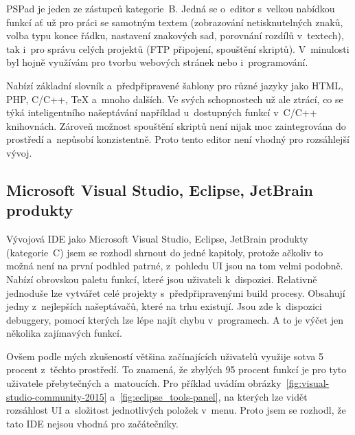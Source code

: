 PSPad je jeden ze zástupců kategorie~B. 
Jedná se o~editor s~velkou nabídkou funkcí ať už pro práci se samotným textem (zobrazování netisknutelných znaků, volba typu konce řádku, nastavení znakových sad, porovnání rozdílů v~textech), tak i~pro správu celých projektů (FTP připojení, spouštění skriptů).
V~minulosti byl hojně využívám pro tvorbu webových stránek nebo i~programování.

Nabízí základní slovník a~předpřipravené šablony pro různé jazyky jako HTML, PHP, C/C++, TeX a~mnoho dalších.
Ve svých schopnostech už ale ztrácí, co se týká inteligentního našeptávání například u~dostupných funkcí v~C/C++ knihovnách.
% 
% 
Zároveň možnost spouštění skriptů není nijak moc zaintegrována do prostředí a~nepůsobí konzistentně.
Proto tento editor není vhodný pro rozsáhlejší vývoj.

\subsection{Microsoft Visual Studio, Eclipse, JetBrain produkty}


Vývojová IDE jako Microsoft Visual Studio, Eclipse, JetBrain produkty (kategorie~C) jsem se rozhodl shrnout do jedné kapitoly, protože ačkoliv to možná není na první podhled patrné, z~pohledu UI jsou na tom velmi podobně.
Nabízí obrovskou paletu funkcí, které jsou uživateli k~dispozici. 
Relativně jednoduše lze vytvářet celé projekty s~předpřipravenými build procesy. 
Obsahují jedny z~nejlepších našeptávačů, které na trhu existují. 
Jsou zde k~dispozici debuggery, pomocí kterých lze lépe najít chybu v~programech.
A to je výčet jen několika zajímavých funkcí.

Ovšem podle mých zkušeností většina začínajících uživatelů využije sotva 5 procent z~těchto prostředí. 
% 
% 
To znamená, že zbylých 95 procent funkcí je pro tyto uživatele přebytečných a~matoucích.  
Pro příklad uvádím obrázky~\ref{fig:visual-studio-community-2015} a~\ref{fig:eclipse_tools-panel}, na kterých lze vidět rozsáhlost UI a~složitost jednotlivých položek v~menu.
Proto jsem se rozhodl, že tato IDE nejsou vhodná pro začátečníky. 
% 
% 

